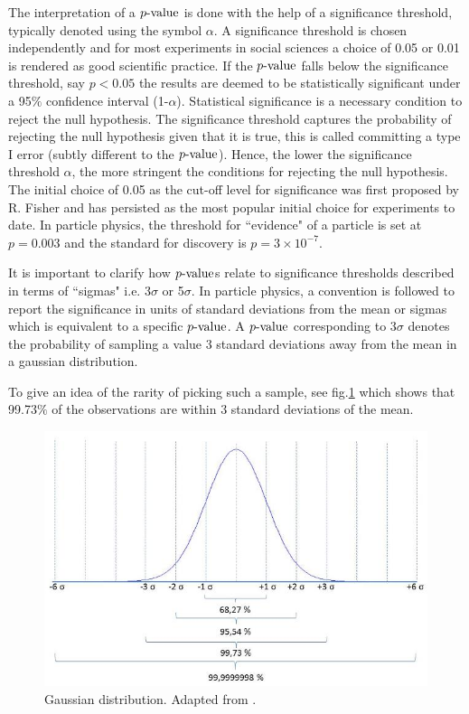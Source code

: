 The interpretation of a $\mathop{p{\textnormal{-value}}}$ is done with the help of a significance threshold, typically denoted using the symbol $\alpha$. A significance threshold is chosen independently and for most experiments in social sciences a choice of 0.05 or 0.01 is rendered as good scientific practice. If the $\mathop{p{\textnormal{-value}}}$ falls below the significance threshold, say $p < 0.05$ the results are deemed to be statistically significant under a 95$\%$ confidence interval (1-$\alpha$). Statistical significance is a necessary condition to reject the null hypothesis. The significance threshold captures the probability of rejecting the null hypothesis given that it is true, this is called committing a type I error (subtly different to the $\mathop{p{\textnormal{-value}}}$). Hence, the lower the significance threshold $\alpha$, the more stringent the conditions for rejecting the null hypothesis. The initial choice of 0.05 as the cut-off level for significance was first proposed by R. Fisher and has persisted as the most popular initial choice for experiments to date. In particle physics, the threshold for ``evidence" of a particle is set at $p=0.003$ and the standard for discovery is $p=3 \times 10^{-7}$. 

It is important to clarify how $\mathop{p{\textnormal{-value}}}$s relate to significance thresholds described in terms of ``sigmas" i.e. 3$\sigma$ or 5$\sigma$. In particle physics, a convention is followed to report the significance in units of standard deviations from the mean or sigmas which is equivalent to a specific $\mathop{p{\textnormal{-value}}}$. A $\mathop{p{\textnormal{-value}}}$ corresponding to 3$\sigma$ denotes the probability of sampling a value 3 standard deviations away from the mean in a gaussian distribution. 

To give an idea of the rarity of picking such a sample, see fig.\ref{sigma} which shows that 99.73$\%$ of the observations are within $3$ standard deviations of the mean. 

\begin{figure}
\begin{center}
\includegraphics[scale=0.7]{images/sigma.jpg}
\caption{Gaussian distribution. Adapted from \cite{sigma}.}
\label{sigma}
\end{center}
\end{figure}

